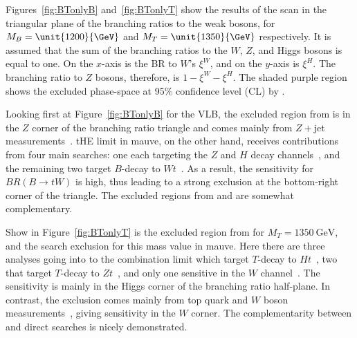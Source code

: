 Figures~\ref{fig:BTonlyB} and~\ref{fig:BTonlyT} show the results of the \contur scan in the triangular plane of the branching ratios to the weak bosons, for $M_B = \unit{1200}{\GeV}$ and $M_T = \unit{1350}{\GeV}$ respectively. It is assumed that the sum of the branching ratios to the $W$, $Z$, and Higgs bosons is equal to one. On the $x$-axis is the BR to $W$'s $\xi^W$, and on the $y$-axis is $\xi^H$. The branching ratio to $Z$ bosons, therefore, is $1-\xi^W-\xi^H$. The shaded purple region shows the excluded phase-space at 95\% confidence level (CL) by \ATLAS. 

Looking first at Figure~\ref{fig:BTonlyB} for the VLB, the excluded region from \contur is in the $Z$ corner of the branching ratio triangle and comes mainly from $Z+$jet measurements~\cite{Aad:2015auj,Aaboud:2017hox,Aaboud:2017hbk,Aaboud:2019jcc}. tHE \ATLAS limit in mauve, on the other hand, receives contributions from four main searches: one each targeting the $Z$ and $H$ decay channels~\cite{ZllSearch,HadSearch}, and the remaining two target $B$-decay to $Wt$~\cite{WtSearch,TriLepSearch}. As a result, the sensitivity for $BR(B\rightarrow tW)$ is high, thus leading to a strong exclusion at the bottom-right corner of the triangle. The excluded regions from \contur and \ATLAS are somewhat complementary. 

Show in Figure~\ref{fig:BTonlyT} is the excluded region from \contur for
$M_T = \SI{1350}{\GeV}$, and the \ATLAS search exclusion for this mass value in mauve. Here there are three analyses going into to the \ATLAS combination limit which target $T$-decay to $Ht$~\cite{HbbSearch,TriLepSearch,HadSearch}, two that target $T$-decay to $Zt$~\cite{ZnunuSearch,ZllSearch}, and only one sensitive in the $W$ channel~\cite{WbSearch}. The \ATLAS sensitivity is mainly in the Higgs corner of the branching ratio half-plane. In contrast, the \contur exclusion comes mainly from top quark and $W$ boson measurements~\cite{Aaboud:2017fye,Aaboud:2018eqg,Sirunyan:2018wem,Khachatryan:2016mnb,Sirunyan:2018ptc}, giving sensitivity in the $W$ corner. The complementarity between \contur and direct searches is nicely demonstrated. 

